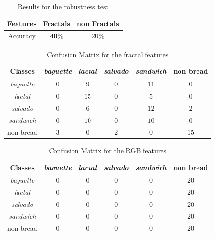 \documentclass[oneside,a4paper,english,links]{amca}
\begin{document}
\begin{table}[htb]
\centering
\begin{tabular}{|c|c|c|}
    \hline
    Features & Fractals & non Fractals\\
    \hline
    \hline
    Accuracy  & $\textbf{40}\%$ & $20\%$\\
    \hline
\end{tabular}
\caption{Results for the robustness test}
\label{table:tableRobustness}
\end{table}


\begin{table}[htb]
\centering
\begin{tabular}{|c|c|c|c|c|c|}
    \hline
    Classes & {\em baguette} & {\em lactal} & {\em salvado} & {\em sandwich} & non bread\\
    \hline
    \hline
    {\em baguette} &   $0$  &   $9$  &   $0$  &  $11$ &   $0$\\
    \hline
    {\em lactal}  & $0$ & $15$ & $0$ & $5$ & $0$\\
    \hline
    {\em salvado} & $0$ & $6$ & $0$ & $12$ & $2$\\
    \hline
    {\em sandwich}  & $0$ & $10$ & $0$ & $10$ & $0$\\
    \hline
    non bread  & $3$ & $0$ & $2$ & $0$ & $15$\\
    \hline
\end{tabular}
\caption{Confusion Matrix for the fractal features}
\label{table:ConfusionMatrixFractal}
\end{table}

\begin{table}[htb]
\centering
\begin{tabular}{|c|c|c|c|c|c|}
    \hline
    Classes & {\em baguette} & {\em lactal} & {\em salvado} & {\em sandwich} & non bread\\
    \hline
    \hline
    {\em baguette}  & $0$ & $0$ & $0$ & $0$ & $20$\\
    \hline
    {\em lactal}  & $0$ & $0$ & $0$ & $0$ & $20$\\
    \hline
    {\em salvado} & $0$ & $0$ & $0$ & $0$ & $20$\\
    \hline
    {\em sandwich}  & $0$ & $0$ & $0$ & $0$ & $20$\\
    \hline
    non bread  & $0$ & $0$ & $0$ & $0$ & $20$\\
    \hline
\end{tabular}
\caption{Confusion Matrix for the RGB features}
\label{table:ConfusionMatrixNonFractal}
\end{table}
\end{document}
